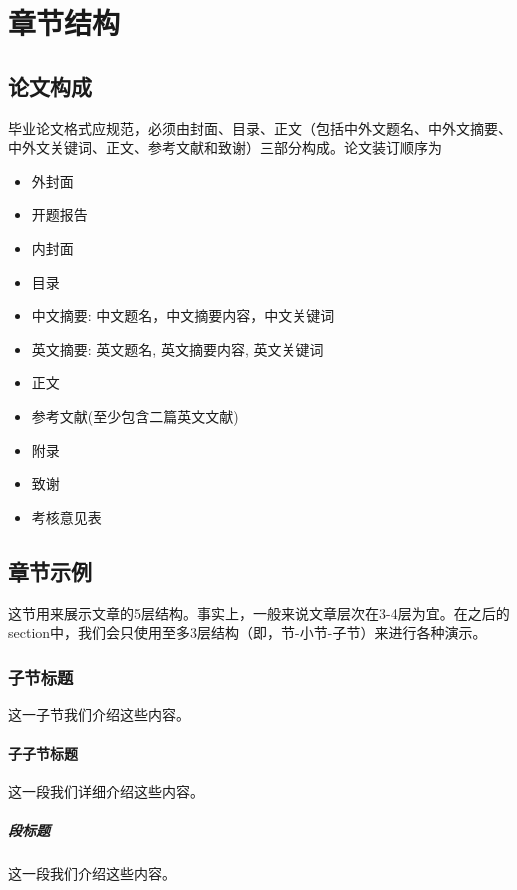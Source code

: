 \chapter{章节结构}\label{chap2}

\section{论文构成}

毕业论文格式应规范，必须由封面、目录、正文（包括中外文题名、中外文摘要、中外文关键词、正文、参考文献和致谢）三部分构成。论文装订顺序为

\begin{itemize}
\item
外封面
\item
开题报告
\item
内封面
\item
目录
\item
中文摘要: 中文题名，中文摘要内容，中文关键词
\item
英文摘要: 英文题名, 英文摘要内容, 英文关键词
\item
正文
\item
参考文献(至少包含二篇英文文献)
\item
附录
\item
致谢
\item
考核意见表
\end{itemize}

\section{章节示例}
这节用来展示文章的5层结构。事实上，一般来说文章层次在3-4层为宜。在之后的section中，我们会只使用至多3层结构（即，节-小节-子节）来进行各种演示。
 
\subsection{子节标题}这一子节我们介绍这些内容。

\subsubsection{子子节标题}这一段我们详细介绍这些内容。 

\paragraph{段标题}这一段我们介绍这些内容。 

